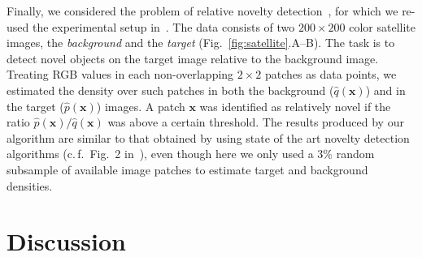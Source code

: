 \documentclass[twoside]{article}
\begin{document}
\begin{figure*}
 \begin{center}
 \end{center}

 \caption{\textbf{A,\ }Background and \textbf{B,\ }target images for relative novelty detection. \textbf{C,\ }Top 5\% novel patches in the target image are highlighted in \emph{red}. The results are qualitatively similar to those presented in~\cite[Fig. 2]{Smola2009}\label{fig:satellite}.}
\end{figure*}

Finally, we considered the problem of relative novelty detection~\cite{Smola2009}, for which we re-used the experimental setup in~\cite{Smola2009}. The data consists of two $200\times 200$ color satellite images, the \emph{background} and the \emph{target} (Fig.~\ref{fig:satellite}.A--B). The task is to detect novel objects on the target image relative to the background image. Treating RGB values in each non-overlapping $2\times 2$ patches as data points, we estimated the density over such patches in both the background ($\hat{q}(\bm{x})$) and in the target ($\hat{p}(\bm{x})$) images. A patch $\bm{x}$ was identified as relatively novel if the ratio $\hat{p}(\bm{x})/\hat{q}(\bm{x})$ was above a certain threshold. The results produced by our algorithm are similar to that obtained by using state of the art novelty detection algorithms (c.\,f.\ Fig.~2 in~\cite{Smola2009}), even though here we only used a 3\% random subsample of available image patches to estimate target and background densities.

\section{Discussion}
\end{document}
